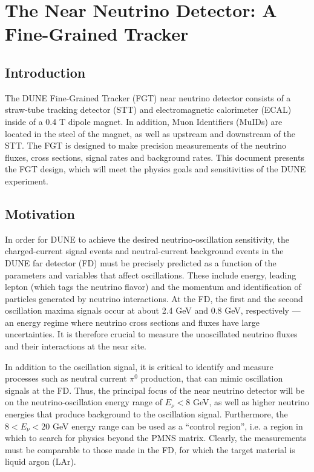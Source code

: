 
\chapter{The Near Neutrino Detector: A Fine-Grained Tracker}
\label{ch:nd-nnd}

\section{Introduction} 
\label{sec:nd-nnd-intro}

The DUNE Fine-Grained Tracker (FGT) near neutrino detector consists of a straw-tube
tracking detector (STT) and electromagnetic calorimeter (ECAL) inside of a 0.4 T
dipole magnet. In addition, Muon Identifiers (MuIDs) are located in the
steel of the magnet, as well as upstream and downstream of the STT. The FGT
is designed to make precision measurements of the neutrino fluxes, 
cross sections, signal rates and background rates. 
This document presents 
the FGT design, which 
will meet the physics goals and sensitivities of the DUNE experiment. 

\section{Motivation}
\label{sec:nd-nnd-motivation}

In order for DUNE to achieve the desired neutrino-oscillation sensitivity, the 
charged-current signal events and neutral-current
background events in the DUNE far detector (FD) must be precisely 
predicted as a function of the parameters and variables that affect 
oscillations. These include energy, leading lepton (which tags the neutrino flavor) and the 
momentum and identification of particles generated by neutrino interactions. 
At the FD, the first and the second 
oscillation maxima signals occur at about 2.4 GeV and 0.8 GeV, respectively 
--- an energy regime where neutrino cross sections and fluxes have large 
uncertainties. It is therefore crucial to measure the unoscillated neutrino fluxes and 
their interactions at the near site. 

In addition to the oscillation signal, it is 
critical to identify and measure processes such as neutral current $\pi^0$ production,
that can mimic oscillation signals 
at the FD. Thus, the principal focus of the near neutrino detector will be 
on the neutrino-oscillation energy range of $E_\nu < 8$ GeV, as well as higher 
neutrino energies that produce background to the oscillation signal. Furthermore, the
$8<E_\nu < 20$ GeV energy range can be used as a ``control region'', %
i.e. a region in which 
to search for physics beyond the PMNS matrix. Clearly, 
the measurements must be 
comparable to those made in the FD, for which the target material is liquid argon (LAr). 

